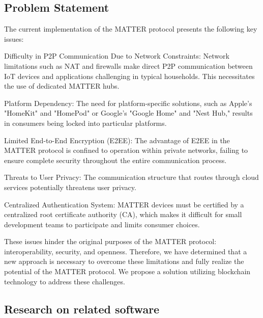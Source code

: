 \documentclass[conference]{IEEEtran}
\begin{document}
\subsection{Problem Statement}
The current implementation of the MATTER protocol presents the following key issues:

Difficulty in P2P Communication Due to Network Constraints: Network limitations such as NAT and firewalls make direct P2P communication between IoT devices and applications challenging in typical households. This necessitates the use of dedicated MATTER hubs.

Platform Dependency: The need for platform-specific solutions, such as Apple's "HomeKit" and "HomePod" or Google's "Google Home" and "Nest Hub," results in consumers being locked into particular platforms.

Limited End-to-End Encryption (E2EE): The advantage of E2EE in the MATTER protocol is confined to operation within private networks, failing to ensure complete security throughout the entire communication process.

Threats to User Privacy: The communication structure that routes through cloud services potentially threatens user privacy.

Centralized Authentication System: MATTER devices must be certified by a centralized root certificate authority (CA), which makes it difficult for small development teams to participate and limits consumer choices.

These issues hinder the original purposes of the MATTER protocol: interoperability, security, and openness. Therefore, we have determined that a new approach is necessary to overcome these limitations and fully realize the potential of the MATTER protocol. We propose a solution utilizing blockchain technology to address these challenges.

\subsection{Research on related software}
\end{document}
